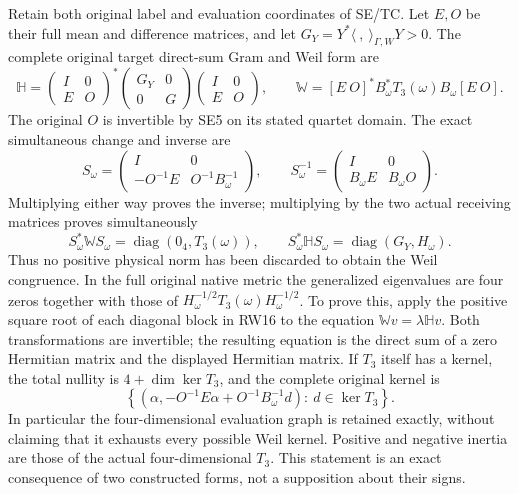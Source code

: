 \documentclass[11pt]{article}
\newcommand{\diag}{\operatorname{diag}}
\begin{document}
Retain both original label and evaluation coordinates of SE/TC.
Let $E,O$ be their full mean and difference matrices, and let
$G_Y=Y^*\langle\ ,\ \rangle_{\Gamma,W}Y>0$.
The complete original target direct-sum Gram and Weil form are
\[
 \mathbb H=
 \begin{pmatrix}I&0\\E&O\end{pmatrix}^{\!*}
 \begin{pmatrix}G_Y&0\\0&G\end{pmatrix}
 \begin{pmatrix}I&0\\E&O\end{pmatrix},\qquad
 \mathbb W=[E\ O]^*B_\omega^*T_3(\omega)B_\omega[E\ O].
 \tag{RW14}
\]
The original $O$ is invertible by SE5 on its stated quartet
domain. The exact simultaneous change and inverse are
\[
 S_\omega=\begin{pmatrix}I&0\\-O^{-1}E&O^{-1}B_\omega^{-1}\end{pmatrix},
 \qquad
 S_\omega^{-1}=\begin{pmatrix}I&0\\B_\omega E&B_\omega O\end{pmatrix}.
 \tag{RW15}
\]
Multiplying either way proves the inverse; multiplying by the
two actual receiving matrices proves simultaneously
\[
 S_\omega^*\mathbb W S_\omega=\diag(0_4,T_3(\omega)),\qquad
 S_\omega^*\mathbb H S_\omega=\diag(G_Y,H_\omega).
 \tag{RW16}
\]
Thus no positive physical norm has been discarded to obtain
the Weil congruence. In the full original native metric the
generalized eigenvalues are four zeros together with those
of $H_\omega^{-1/2}T_3(\omega)H_\omega^{-1/2}$.
To prove this, apply the positive square root of each diagonal
block in RW16 to the equation $\mathbb Wv=\lambda\mathbb Hv$.
Both transformations are invertible; the resulting equation is
the direct sum of a zero Hermitian matrix and the displayed
Hermitian matrix. If $T_3$ itself has a kernel, the total
nullity is $4+\dim\ker T_3$, and the complete original kernel is
\[
 \left\{\left(\alpha,-O^{-1}E\alpha+
          O^{-1}B_\omega^{-1}d\right):\ d\in\ker T_3\right\}.
 \tag{RW17}
\]
In particular the four-dimensional evaluation graph is retained
exactly, without claiming that it exhausts every possible Weil
kernel. Positive and negative inertia are those of the actual
four-dimensional $T_3$. This statement is an exact consequence
of two constructed forms, not a supposition about their signs.
\end{document}
